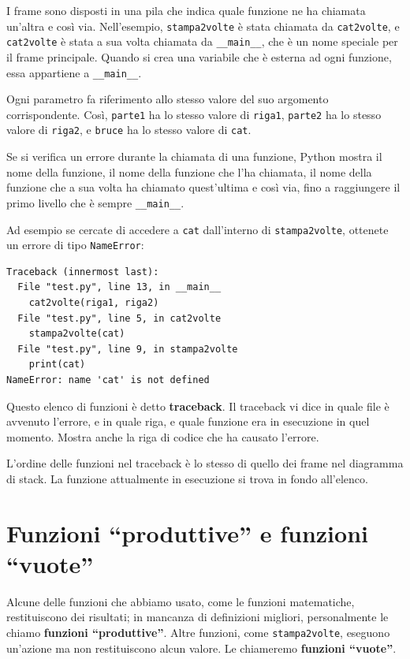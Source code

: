 \documentclass[10pt]{book}
\begin{document}
I frame sono disposti in una pila che indica quale funzione ne ha chiamata un'altra e così via. Nell'esempio, \verb"stampa2volte" è stata chiamata da \verb"cat2volte", e \verb"cat2volte" è stata a sua volta chiamata da 
\verb"__main__", che è un nome speciale per il frame principale. Quando si crea una variabile che è esterna ad ogni funzione, essa appartiene a 
\verb"__main__".

Ogni parametro fa riferimento allo stesso valore del suo argomento corrispondente. Così, {\tt parte1} ha lo stesso valore di
{\tt riga1}, {\tt parte2} ha lo stesso valore di {\tt riga2},
e {\tt bruce} ha lo stesso valore di {\tt cat}.

Se si verifica un errore durante la chiamata di una funzione, Python mostra il nome della funzione, il nome della funzione che l'ha chiamata, il nome della funzione che a sua volta ha chiamato quest'ultima e così via, fino a raggiungere il primo livello che è sempre \verb"__main__".

Ad esempio se cercate di accedere a {\tt cat} dall'interno di
\verb"stampa2volte", ottenete un errore di tipo {\tt NameError}:

\begin{verbatim}
Traceback (innermost last):
  File "test.py", line 13, in __main__
    cat2volte(riga1, riga2)
  File "test.py", line 5, in cat2volte
    stampa2volte(cat)
  File "test.py", line 9, in stampa2volte
    print(cat)
NameError: name 'cat' is not defined
\end{verbatim}
%
Questo elenco di funzioni è detto {\bf traceback}. Il traceback vi dice in quale file è avvenuto l'errore, e in quale riga, e quale funzione era in esecuzione in quel momento. Mostra anche la riga di codice che ha causato l'errore.

L'ordine delle funzioni nel traceback è lo stesso di quello dei frame nel diagramma di stack. La funzione attualmente in esecuzione si trova in fondo all'elenco.


\section{Funzioni ``produttive'' e funzioni ``vuote''}

Alcune delle funzioni che abbiamo usato, come le funzioni matematiche, restituiscono dei risultati; in mancanza di definizioni migliori, personalmente le chiamo {\bf funzioni ``produttive''}.  Altre funzioni, come \verb"stampa2volte", eseguono un'azione ma non restituiscono alcun valore. Le chiameremo {\bf funzioni ``vuote''}.
\end{document}
